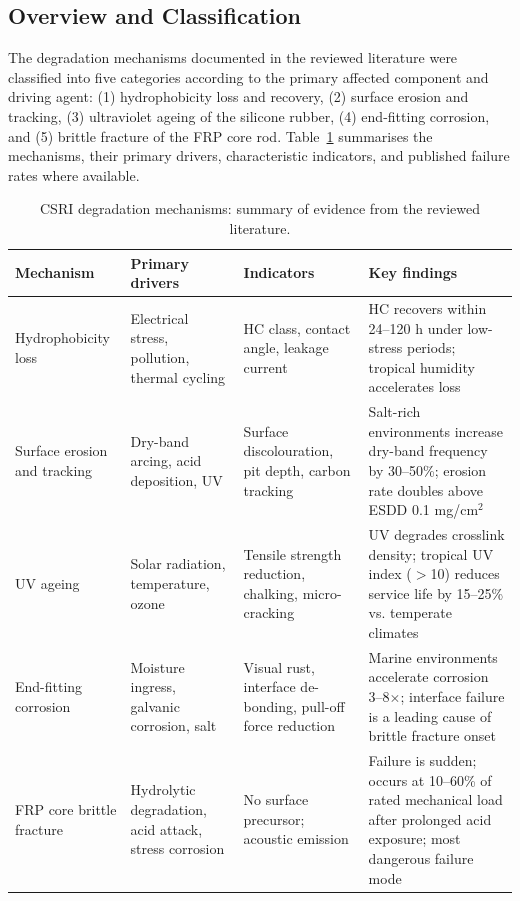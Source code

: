 \documentclass[preprint,12pt,3p]{elsarticle}
\begin{document}
\subsection{Overview and Classification}

The degradation mechanisms documented in the reviewed literature were
classified into five categories according to the primary affected
component and driving agent: (1) hydrophobicity loss and recovery,
(2) surface erosion and tracking, (3) ultraviolet ageing of the
silicone rubber, (4) end-fitting corrosion, and (5) brittle fracture
of the FRP core rod. Table~\ref{tab:degradation} summarises the
mechanisms, their primary drivers, characteristic indicators, and
published failure rates where available.

\begin{table}[h]
\centering
\caption{CSRI degradation mechanisms: summary of evidence from the
  reviewed literature.}
\label{tab:degradation}
\begin{tabular}{p{3cm} p{3cm} p{3cm} p{4cm}}
\toprule
\textbf{Mechanism} & \textbf{Primary drivers} & \textbf{Indicators} &
\textbf{Key findings} \\
\midrule
Hydrophobicity loss & Electrical stress, pollution, thermal cycling &
HC class, contact angle, leakage current &
HC recovers within 24--120 h under low-stress periods; tropical humidity
accelerates loss \cite{Gubanski1990, Ramirez2020} \\
\addlinespace
Surface erosion and tracking & Dry-band arcing, acid deposition, UV &
Surface discolouration, pit depth, carbon tracking &
Salt-rich environments increase dry-band frequency by 30--50\%;
erosion rate doubles above ESDD 0.1 mg/cm$^2$ \cite{Montoya2016, Jiang2019} \\
\addlinespace
UV ageing & Solar radiation, temperature, ozone &
Tensile strength reduction, chalking, micro-cracking &
UV degrades crosslink density; tropical UV index ($>$10) reduces service
life by 15--25\% vs. temperate climates \cite{Ramirez2020, Saleem2022} \\
\addlinespace
End-fitting corrosion & Moisture ingress, galvanic corrosion, salt &
Visual rust, interface de-bonding, pull-off force reduction &
Marine environments accelerate corrosion 3--8$\times$; interface
failure is a leading cause of brittle fracture onset \cite{Papailiou2012} \\
\addlinespace
FRP core brittle fracture & Hydrolytic degradation, acid attack, stress
corrosion & No surface precursor; acoustic emission &
Failure is sudden; occurs at 10--60\% of rated mechanical load after
prolonged acid exposure; most dangerous failure mode \cite{Papailiou2012, BrittleFracture2021} \\
\bottomrule
\end{tabular}
\end{table}
\end{document}
